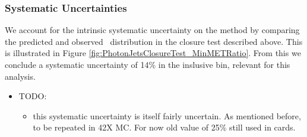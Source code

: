 %
%
\subsubsection{Systematic Uncertainties}

We account for the intrinsic systematic uncertainty on the method by comparing
the predicted and observed \met~distribution in the closure test described above.
This is illustrated in Figure \ref{fig:PhotonJetsClosureTest_MinMETRatio}.
From this we conclude a systematic uncertainty of 14\% in the inslusive bin, relevant for this analysis.

\begin{itemize}
    \item TODO:
    \begin{itemize}
        \item this systematic uncertainty is itself fairly uncertain.
As mentioned before, to be repeated in 42X MC.  For now old value of 25\% still used in cards.
    \end{itemize}
\end{itemize}

